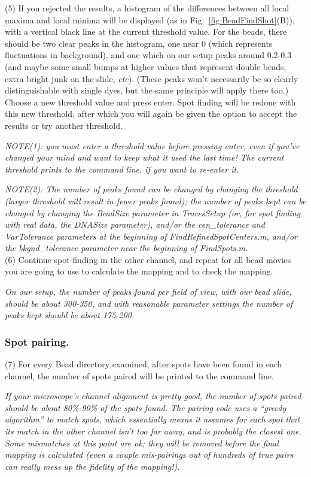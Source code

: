\documentclass[11pt]{article}
\begin{document}
\noindent (5) If you rejected the results, a histogram of the differences between all local maxima and local minima will be displayed (as in Fig.~\ref{fig:BeadFindShot}(B)), with a vertical black line at the current threshold value.  For the beads, there should be two clear peaks in the histogram, one near 0 (which represents fluctuations in background), and one which on our setup peaks around 0.2-0.3 (and maybe some small bumps at higher values that represent double beads, extra bright junk on the slide, {\it etc}). (These peaks won't necessarily be so clearly distinguishable with single dyes, but the same principle will apply there too.) Choose a new threshold value and press enter.  Spot finding will be redone with this new threshold, after which you will again be given the option to accept the results or try another threshold.

{\it NOTE(1): you must enter a threshold value before pressing enter, even if you've changed your mind and want to keep what it used the last time!  The current threshold prints to the command line, if you want to re-enter it.}

{\it NOTE(2): The number of peaks found can be changed by changing the threshold (larger threshold will result in fewer peaks found); the number of peaks kept can be changed by changing the BeadSize parameter in TracesSetup (or, for spot finding with real data, the DNASize parameter), and/or the cen\_tolerance and VarTolerance parameters at the beginning of FindRefinedSpotCenters.m, and/or the bkgnd\_tolerance parameter near the beginning of FindSpots.m.}  \\

\noindent (6) Continue spot-finding in the other channel, and repeat for all bead movies you are going to use to calculate the mapping and to check the mapping. 

{\it On our setup, the number of peaks found per field of view, with our bead slide, should be about 300-350, and with reasonable parameter settings the number of peaks kept should be about 175-200.}

\subsubsection{Spot pairing.}

\noindent (7) For every Bead directory examined, after spots have been found in each channel, the number of spots paired will be printed to the command line. 

{\it If your microscope's channel alignment is pretty good, the number of spots paired should be about 80\%-90\% of the spots found. The pairing code uses a ``greedy algorithm'' to match spots, which essentially means it assumes for each spot that its match in the other channel isn't too far away, and is probably the closest one.  Some mismatches at this point are ok; they will be removed before the final mapping is calculated (even a couple mis-pairings out of hundreds of true pairs can really mess up the fidelity of the mapping!).} \\
\end{document}
